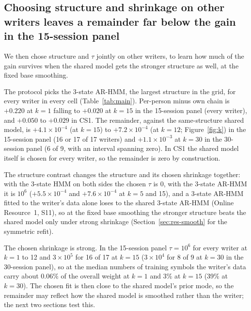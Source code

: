 \documentclass[pdflatex,sn-basic]{sn-jnl}
\newcommand{\Sref}[1]{Online Resource~1, S#1}
\newcommand{\hmmthree}{\mbox{3-state} HMM}
\newcommand{\arthree}{\mbox{3-state} \mbox{AR-HMM}}
\begin{document}
\subsection{Choosing structure and shrinkage on other writers leaves a remainder far below the gain in the 15-session panel}\label{sec:res-protocol}
We then chose structure and $\tau$ jointly on other writers, to learn how much of the gain survives when the shared model gets the stronger structure as well, at the fixed base smoothing.

The protocol picks the \arthree, the largest structure in the grid, for every writer in every cell (Table~\ref{tab:main}). Per-person minus own chain is $+0.220$ at $k=1$ falling to $+0.020$ at $k=15$ in the 15-session panel (every writer), and $+0.050$ to $+0.029$ in CS1. The remainder, against the same-structure shared model, is $+4.1\times10^{-4}$ (at $k=15$) to $+7.2\times10^{-4}$ (at $k=12$; Figure~\ref{fig:k}) in the 15-session panel (16 or 17 of 17 writers) and $+1.1\times10^{-3}$ at $k=30$ in the 30-session panel (6 of 9, with an interval spanning zero). In CS1 the shared model itself is chosen for every writer, so the remainder is zero by construction.

The structure contrast changes the structure and its chosen shrinkage together: with the \hmmthree{} on both sides the chosen $\tau$ is 0, with the \arthree{} it is $10^6$ ($+5.5\times10^{-4}$ and $+7.6\times10^{-4}$ at $k=5$ and 15), and a \arthree{} fitted to the writer's data alone loses to the shared \arthree{} (\Sref{11}), so at the fixed base smoothing the stronger structure beats the shared model only under strong shrinkage (Section~\ref{sec:res-smooth} for the symmetric refit).

The chosen shrinkage is strong. In the 15-session panel $\tau=10^6$ for every writer at $k=1$ to 12 and $3\times10^5$ for 16 of 17 at $k=15$ ($3\times10^4$ for 8 of 9 at $k=30$ in the 30-session panel), so at the median numbers of training symbols the writer's data carry about 0.06\% of the overall weight at $k=1$ and 3\% at $k=15$ (39\% at $k=30$). The chosen fit is then close to the shared model's prior mode, so the remainder may reflect how the shared model is smoothed rather than the writer; the next two sections test this.
\end{document}
